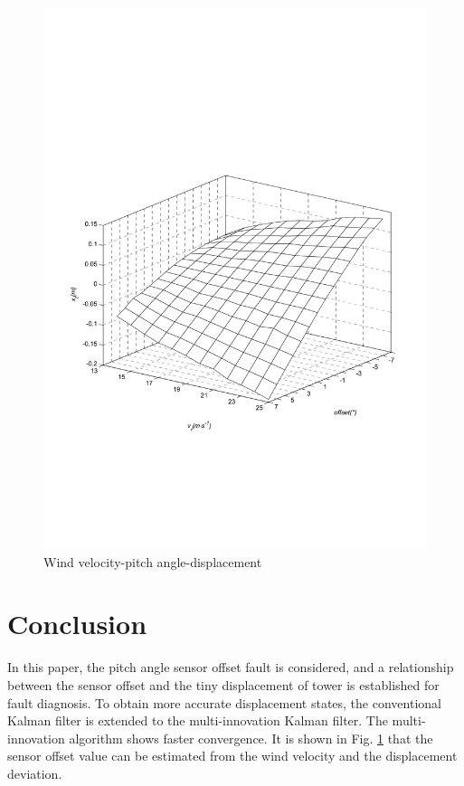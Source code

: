 \documentclass{article}
\begin{document}
\begin{figure}[H]
  \centering
  \includegraphics[width=0.9\hsize]{MATLAB-3d.pdf}
  \caption{Wind velocity-pitch angle-displacement}
  \label{fig:3d}
\end{figure}


\section{Conclusion}

In this paper, the pitch angle sensor offset fault is considered,
and a
relationship between the sensor offset and the tiny displacement of
tower is established for fault diagnosis. To obtain more
accurate displacement states, the conventional Kalman filter is
extended to the multi-innovation Kalman filter. The multi-innovation
algorithm shows faster convergence.
It is shown in Fig. \ref{fig:3d} that the sensor offset value
can be estimated from the wind velocity and the displacement
deviation.
\end{document}
